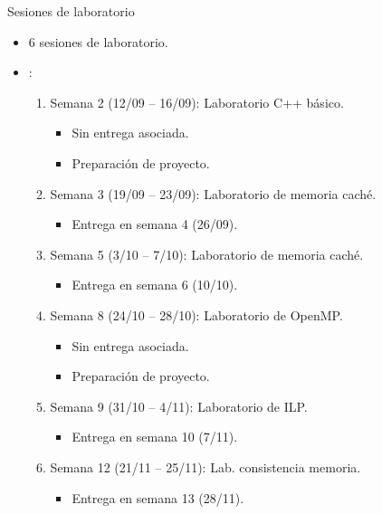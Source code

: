 \begin{frame}[t]{Sesiones de laboratorio}
\begin{itemize}
  \item 6 sesiones de laboratorio.

  \item {}:
    \begin{enumerate}
      \item Semana 2 (12/09 -- 16/09): Laboratorio C++ básico.
        \begin{itemize}
          \item Sin entrega asociada.
          \item Preparación de proyecto.
        \end{itemize}
      \item Semana 3 (19/09 -- 23/09): Laboratorio de memoria caché.
        \begin{itemize}
          \item Entrega en semana 4 (26/09).
        \end{itemize}
      \item Semana 5 (3/10 -- 7/10): Laboratorio de memoria caché.
        \begin{itemize}
          \item Entrega en semana 6 (10/10).
        \end{itemize}
      \item Semana 8 (24/10 -- 28/10): Laboratorio de OpenMP.
        \begin{itemize}
          \item Sin entrega asociada.
          \item Preparación de proyecto.
        \end{itemize}
      \item Semana 9 (31/10 -- 4/11): Laboratorio de ILP.
        \begin{itemize}
          \item Entrega en semana 10 (7/11).
        \end{itemize}
      \item Semana 12 (21/11 -- 25/11): Lab. consistencia memoria.
        \begin{itemize}
          \item Entrega en semana 13 (28/11).
        \end{itemize}
    \end{enumerate}
\end{itemize}
\end{frame}

